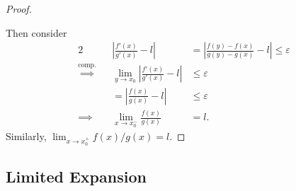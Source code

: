 \documentclass{article}
\newcommand{\?}{\stackrel{?}{=}}
\theoremstyle{definition} %
\begin{document}
\begin{itemize}
\begin{proof}
\begin{center}
        \end{center}
        Then consider
        \begin{alignat*}{2}
            &&\left|\frac{f'(x)}{g'(x)} - l \right| &= \left|\frac{f(y) - f(x)}{g(y) - g(x)} - l\right| \leq \varepsilon \\
            \overset{\text{comp.}}{\implies}&& \lim_{y \to x_0}  \left|\frac{f'(x)}{g'(x)} - l \right| &\leq \varepsilon \\
            && = \left|\frac{f(x)}{g(x)} - l \right| &\leq \varepsilon \\
            \implies&& \lim_{x \to x_0^-} \frac{f(x)}{g(x)} &= l.
        \end{alignat*}
        Similarly, $\lim_{x \to x_0^+} f(x)/g(x) = l$.
     \end{proof}
\end{itemize}

\subsection{Limited Expansion}
\end{document}
